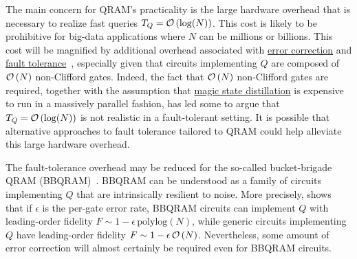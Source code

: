 \begin{refsection}
The main concern for QRAM's practicality is the large hardware overhead that is necessary to realize fast queries $T_Q = \mathcal{O}\left( \log(N) \right)$. This cost is likely to be prohibitive for big-data applications where $N$ can be millions or billions. This cost will be magnified by additional overhead associated with \hyperref[prim:QEC]{error correction} and \hyperref[prim:FaultTolerance]{fault tolerance}~\cite{dimatteo2020FaultTolerantQRAM}, especially given that circuits implementing $Q$ are composed of $\mathcal{O}\left( N \right)$ non-Clifford gates. Indeed, the fact that $\mathcal{O}\left( N \right)$ non-Clifford gates are required, together with the assumption that \hyperref[prim:LatticeSurgery]{magic state distillation} is expensive to run in a massively parallel fashion, has led some to argue that $T_Q = \mathcal{O}\left( \log(N) \right)$ is not realistic in a fault-tolerant setting. It is possible that alternative approaches to fault tolerance tailored to QRAM could help alleviate this large hardware overhead.

The fault-tolerance overhead may be reduced for the so-called bucket-brigade QRAM (BBQRAM)~\cite{giovannetti2007QuantumRAM, arunachalam2015RobustnessBuckBrigQRAM, hann2021resilienceofQRAM}. BBQRAM can be understood as a family of circuits implementing $Q$ that are intrinsically resilient to noise. More precisely, \cite{hann2021resilienceofQRAM} shows that if $\epsilon$ is the per-gate error rate, BBQRAM circuits can implement $Q$ with leading-order fidelity $F \sim 1- \epsilon\, \mathrm{polylog}(N)$, while generic circuits implementing $Q$ have leading-order fidelity $F \sim 1- \epsilon\, \mathcal{O}\left( N \right)$. Nevertheless, some amount of error correction will almost certainly be required even for BBQRAM circuits. 


\end{refsection}
